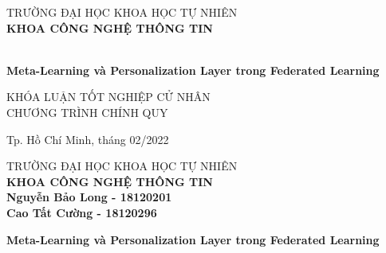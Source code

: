 \begin{titlepage}

    \begin{center}
    TRƯỜNG ĐẠI HỌC KHOA HỌC TỰ NHIÊN\\
    \textbf{KHOA CÔNG NGHỆ THÔNG TIN}\\[2cm]


    { \Large \bfseries \tenSV\\[2cm] } 


    { \Large \bfseries Meta-Learning và Personalization Layer trong Federated Learning\\[3cm]} 


    \large KHÓA LUẬN TỐT NGHIỆP CỬ NHÂN\\
    \large CHƯƠNG TRÌNH CHÍNH QUY\\



    \vfill
    Tp. Hồ Chí Minh, tháng 02/2022

    \end{center}

    \pagebreak

    \begin{center}

    TRƯỜNG ĐẠI HỌC KHOA HỌC TỰ NHIÊN\\
    \textbf{KHOA CÔNG NGHỆ THÔNG TIN}\\[2cm]

    {\large \bfseries Nguyễn Bảo Long - 18120201\\} 
    {\large \bfseries Cao Tất Cường - 18120296\\[2cm]}

    { \Large \bfseries Meta-Learning và Personalization Layer trong Federated Learning\\[3cm]} 



\end{center}
\end{titlepage}
